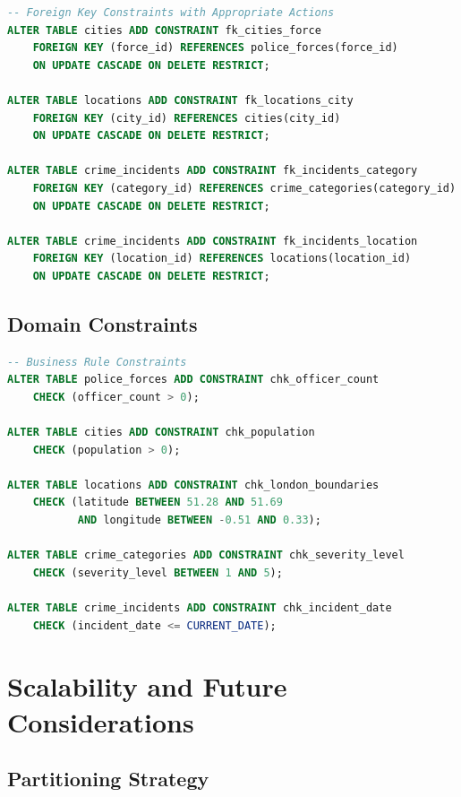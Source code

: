 \documentclass[12pt,a4paper]{article}
\begin{document}
\begin{lstlisting}[language=SQL]
-- Foreign Key Constraints with Appropriate Actions
ALTER TABLE cities ADD CONSTRAINT fk_cities_force 
    FOREIGN KEY (force_id) REFERENCES police_forces(force_id) 
    ON UPDATE CASCADE ON DELETE RESTRICT;

ALTER TABLE locations ADD CONSTRAINT fk_locations_city 
    FOREIGN KEY (city_id) REFERENCES cities(city_id) 
    ON UPDATE CASCADE ON DELETE RESTRICT;

ALTER TABLE crime_incidents ADD CONSTRAINT fk_incidents_category 
    FOREIGN KEY (category_id) REFERENCES crime_categories(category_id) 
    ON UPDATE CASCADE ON DELETE RESTRICT;

ALTER TABLE crime_incidents ADD CONSTRAINT fk_incidents_location 
    FOREIGN KEY (location_id) REFERENCES locations(location_id) 
    ON UPDATE CASCADE ON DELETE RESTRICT;
\end{lstlisting}

\subsection{Domain Constraints}

\begin{lstlisting}[language=SQL]
-- Business Rule Constraints
ALTER TABLE police_forces ADD CONSTRAINT chk_officer_count 
    CHECK (officer_count > 0);

ALTER TABLE cities ADD CONSTRAINT chk_population 
    CHECK (population > 0);

ALTER TABLE locations ADD CONSTRAINT chk_london_boundaries 
    CHECK (latitude BETWEEN 51.28 AND 51.69 
           AND longitude BETWEEN -0.51 AND 0.33);

ALTER TABLE crime_categories ADD CONSTRAINT chk_severity_level 
    CHECK (severity_level BETWEEN 1 AND 5);

ALTER TABLE crime_incidents ADD CONSTRAINT chk_incident_date 
    CHECK (incident_date <= CURRENT_DATE);
\end{lstlisting}

\section{Scalability and Future Considerations}

\subsection{Partitioning Strategy}
\end{document}
